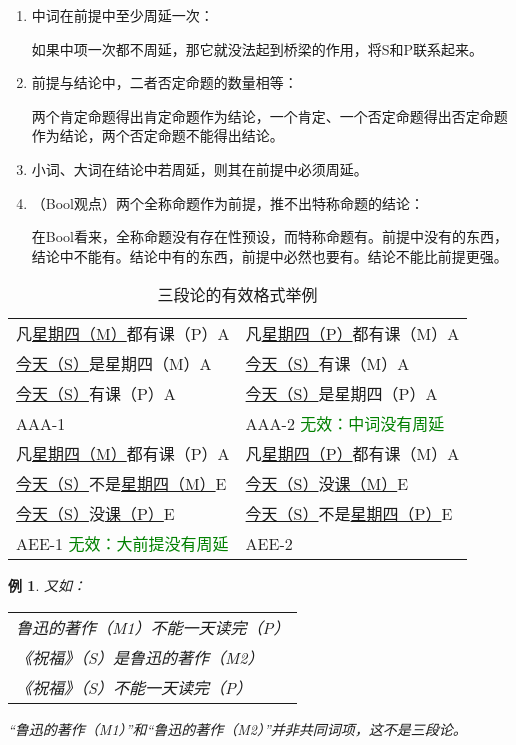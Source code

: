 \documentclass[12pt,onecolumn,a4paper]{book}
\newtheorem*{example}{例}
\numberwithin{table}{subsection}
\numberwithin{equation}{subsection}
\begin{document}
\begin{enumerate}[itemsep=0pt,parsep=0pt]
\item 中词在前提中至少周延一次：

如果中项一次都不周延，那它就没法起到桥梁的作用，将S和P联系起来。

\item 前提与结论中，二者否定命题的数量相等：

两个肯定命题得出肯定命题作为结论，一个肯定、一个否定命题得出否定命题作为结论，两个否定命题不能得出结论。

\item 小词、大词在结论中若周延，则其在前提中必须周延。
\item （Bool观点）两个全称命题作为前提，推不出特称命题的结论：

在Bool看来，全称命题没有存在性预设，而特称命题有。前提中没有的东西，结论中不能有。结论中有的东西，前提中必然也要有。结论不能比前提更强。

\end{enumerate}

\begin{table}[h]
\begin{center}
    \begin{tabular}{l|l}
        凡\underline{星期四（M）}都有课（P）A&凡\underline{星期四（P）}都有课（M）A\\
        \underline{今天（S）}是星期四（M）A&\underline{今天（S）}有课（M）A\\
        \hdashline
        \underline{ 今天（S）}有课（P）A&\underline{今天（S）}是星期四（P）A\\
        \hline
        AAA-1      &               AAA-2  \textcolor{green}{无效：中词没有周延}\\
        \hline
        凡\underline{星期四（M）}都有课（P）A &凡\underline{星期四（P）}都有课（M）A\\
        \underline{今天（S）}不是\underline{星期四（M）}E&\underline{今天（S）}没\underline{课（M）}E\\
        \hdashline
        \underline{今天（S）}没\underline{课（P）}E & \underline{今天（S）}不是\underline{星期四（P）}E\\
        \hline
        AEE-1 \textcolor{green}{无效：大前提没有周延}&AEE-2\\
    \end{tabular}
    \caption{三段论的有效格式举例}
\end{center}
\end{table}

\begin{example}
    又如：
\begin{center}
\begin{tabular}{l}
鲁迅的著作（M1）不能一天读完（P）\\
《祝福》（S）是鲁迅的著作（M2）\\
\hdashline
《祝福》（S）不能一天读完（P）\\
\end{tabular}
\end{center}
“鲁迅的著作（M1）”和“鲁迅的著作（M2）”并非共同词项，这不是三段论。
\end{example}
\end{document}
